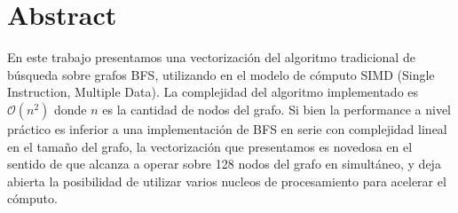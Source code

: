 \section{Abstract}

En este trabajo presentamos una vectorización del algoritmo tradicional de búsqueda sobre grafos BFS, utilizando en el modelo de cómputo SIMD (Single Instruction, Multiple Data). La complejidad del algoritmo implementado es $\mathcal{O}(n^2)$ donde $n$ es la cantidad de nodos del grafo. Si bien la performance a nivel práctico es inferior a una implementación de BFS en serie con complejidad lineal en el tamaño del grafo, la vectorización que presentamos es novedosa en el sentido de que alcanza a operar sobre 128 nodos del grafo en simultáneo, y deja abierta la posibilidad de utilizar varios nucleos de procesamiento para acelerar el cómputo.